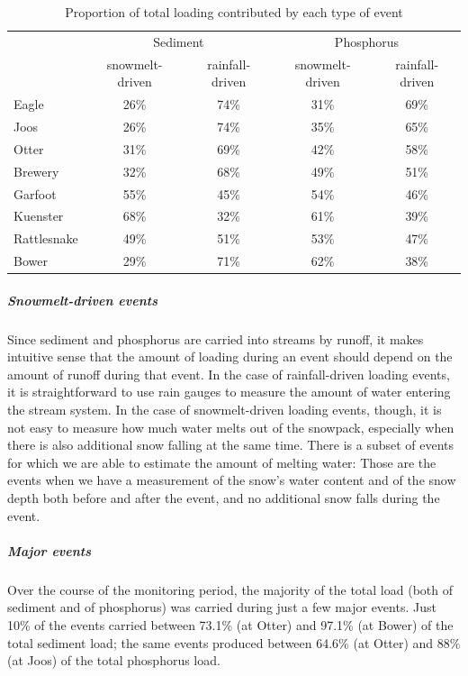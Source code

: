 \documentclass[10pt]{article}
\begin{document}
\begin{table}[ht]
\begin{center}
\begin{tabular}{lcccc}
   & \multicolumn{2}{c}{Sediment} & \multicolumn{2}{c}{Phosphorus} \\
 & snowmelt-driven & rainfall-driven & snowmelt-driven & rainfall-driven \\ 
  \hline
Eagle & 26\% & 74\% & 31\% & 69\% \\ 
  Joos & 26\% & 74\% & 35\% & 65\% \\ 
  Otter & 31\% & 69\% & 42\% & 58\% \\ 
  Brewery & 32\% & 68\% & 49\% & 51\% \\ 
  Garfoot & 55\% & 45\% & 54\% & 46\% \\ 
  Kuenster & 68\% & 32\% & 61\% & 39\% \\ 
  Rattlesnake & 49\% & 51\% & 53\% & 47\% \\ 
  Bower & 29\% & 71\% & 62\% & 38\% \\ 
  \end{tabular}
\caption{Proportion of total loading contributed by each type of event}
\label{tab:stot}
\end{center}
\end{table}
\subparagraph{Snowmelt-driven events}
Since sediment and phosphorus are carried into streams by runoff, it makes intuitive sense that the amount of loading during an event should depend on the amount of runoff during that event. In the case of rainfall-driven loading events, it is straightforward to use rain gauges to measure the amount of water entering the stream system. In the case of snowmelt-driven loading events, though, it is not easy to measure how much water melts out of the snowpack, especially when there is also additional snow falling at the same time. There is a subset of events for which we are able to estimate the amount of melting water: Those are the events when we have a measurement of the snow's water content and of the snow depth both before and after the event, and no additional snow falls during the event.\\

\subparagraph{Major events}
Over the course of the monitoring period, the majority of the total load (both of sediment and of phosphorus) was carried during just a few major events. Just 10\% of the events carried between 73.1\% (at Otter) and 97.1\% (at Bower) of the total sediment load; the same events produced between 64.6\% (at Otter) and 88\% (at Joos) of the total phosphorus load.\\
\end{document}
